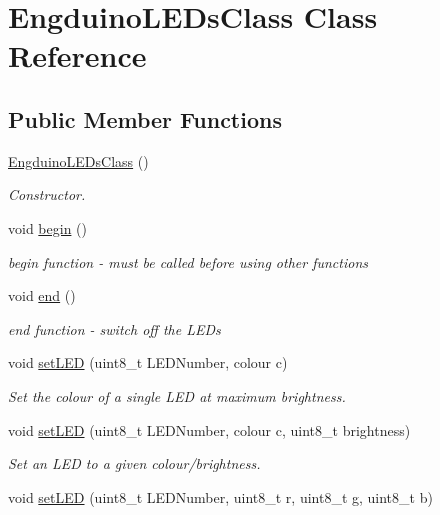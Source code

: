 \hypertarget{class_engduino_l_e_ds_class}{}\section{Engduino\+L\+E\+Ds\+Class Class Reference}
\label{class_engduino_l_e_ds_class}
\subsection*{Public Member Functions}
\begin{DoxyCompactItemize}
\item 
\hyperlink{group___engduino_l_e_ds_ga37cd3409485caa6cd8712e9d70c95171}{Engduino\+L\+E\+Ds\+Class} ()
\begin{DoxyCompactList}\small\item\em Constructor. \end{DoxyCompactList}\item 
void \hyperlink{group___engduino_l_e_ds_ga288fdb1044c2685bd16f2ab7ea793e9f}{begin} ()
\begin{DoxyCompactList}\small\item\em begin function -\/ must be called before using other functions \end{DoxyCompactList}\item 
void \hyperlink{group___engduino_l_e_ds_ga07e877de81c2a7016ab65564f2e0b2df}{end} ()
\begin{DoxyCompactList}\small\item\em end function -\/ switch off the L\+E\+Ds \end{DoxyCompactList}\item 
void \hyperlink{group___engduino_l_e_ds_ga02934e20c403fc14d563fbf09d3a3b68}{set\+L\+E\+D} (uint8\+\_\+t L\+E\+D\+Number, colour c)
\begin{DoxyCompactList}\small\item\em Set the colour of a single L\+E\+D at maximum brightness. \end{DoxyCompactList}\item 
void \hyperlink{group___engduino_l_e_ds_gab354e5a76be82762e0a5c0f96abd75a6}{set\+L\+E\+D} (uint8\+\_\+t L\+E\+D\+Number, colour c, uint8\+\_\+t brightness)
\begin{DoxyCompactList}\small\item\em Set an L\+E\+D to a given colour/brightness. \end{DoxyCompactList}\item 
void \hyperlink{group___engduino_l_e_ds_ga1c7421a4eed2e09aeda98da4a4b29483}{set\+L\+E\+D} (uint8\+\_\+t L\+E\+D\+Number, uint8\+\_\+t r, uint8\+\_\+t g, uint8\+\_\+t b)

\end{DoxyCompactItemize}
